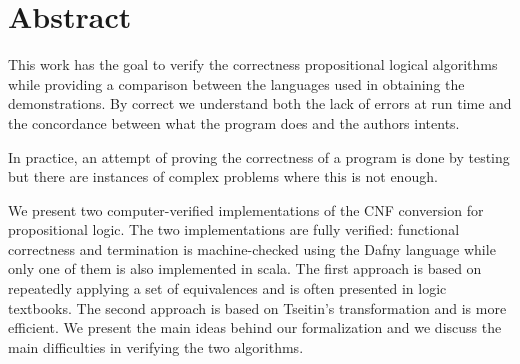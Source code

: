 \chapter*{Abstract} 



This work has the goal to verify the correctness propositional 
logical algorithms while providing a comparison between the 
languages used in obtaining the demonstrations. By correct we 
understand both the lack of errors at run time and the concordance 
between what the program does and the authors intents.

In practice, an attempt of proving the correctness of a program 
is done by testing but there are instances of complex problems 
where this is not enough.

 

We present two computer-verified implementations of the CNF
conversion for propositional logic. The two implementations are
fully verified: functional correctness and termination is
machine-checked using the Dafny language while only one of them 
is also implemented in scala. The first approach is
based on repeatedly applying a set of equivalences and is often
presented in logic textbooks. The second approach is based on
Tseitin's transformation and is more efficient. We present the main
ideas behind our formalization and we discuss the main difficulties
in verifying the two algorithms.

